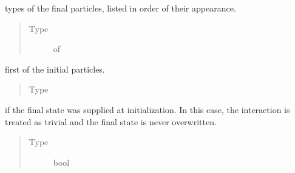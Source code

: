 \documentclass[letterpaper,10pt,english]{sphinxmanual}
\begin{document}
\begin{fulllineitems}
\begin{fulllineitems}
\begin{quote}
\begin{description}
\end{description}\end{quote}

\end{fulllineitems}


\begin{fulllineitems}
\label{\detokenize{code_structure:id5}}
types of the final particles, listed in
order of their appearance.
\begin{quote}\begin{description}
\item[{Type}] \leavevmode
{} of 

\end{description}\end{quote}

\end{fulllineitems}


\begin{fulllineitems}
\label{\detokenize{code_structure:scdc.interaction.Interaction.ip}}
first of the initial particles.
\begin{quote}\begin{description}
\item[{Type}] \leavevmode
{}

\end{description}\end{quote}

\end{fulllineitems}


\begin{fulllineitems}
\label{\detokenize{code_structure:scdc.interaction.Interaction.fixed_final_state}}
 if the final state was supplied at
initialization. In this case, the interaction is treated as trivial
and the final state is never overwritten.
\begin{quote}\begin{description}
\item[{Type}] \leavevmode
bool


\end{description}
\end{quote}
\end{fulllineitems}
\end{fulllineitems}
\end{document}

